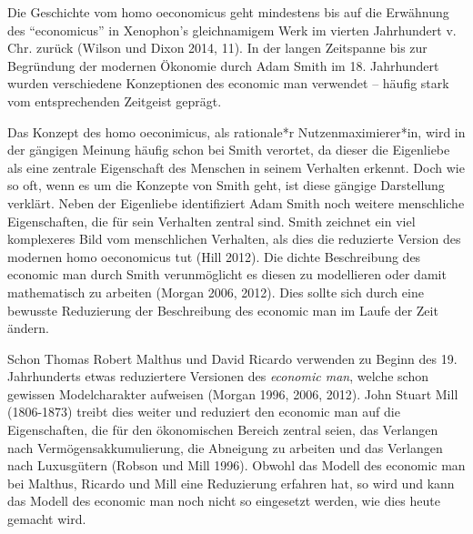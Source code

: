 \documentclass[
  nswissgerman,
  a4paper,
  DIV=11,
  numbers=noendperiod,
  oneside,
  openany]{scrreprt}
\begin{document}
\begin{tcolorbox}[enhanced jigsaw, arc=.35mm, bottomrule=.15mm, bottomtitle=1mm, breakable, colback=white, colbacktitle=quarto-callout-tip-color!10!white, colframe=quarto-callout-tip-color-frame, coltitle=black, left=2mm, leftrule=.75mm, opacityback=0, opacitybacktitle=0.6, rightrule=.15mm, title={Exkurs: Geschichte des Homo Oeconomicus}, titlerule=0mm, toprule=.15mm, toptitle=1mm]

Die Geschichte vom homo oeconomicus geht mindestens bis auf die
Erwähnung des ``economicus'' in Xenophon's gleichnamigem Werk im vierten
Jahrhundert v. Chr. zurück (Wilson und Dixon 2014, 11). In der langen
Zeitspanne bis zur Begründung der modernen Ökonomie durch Adam Smith im
18. Jahrhundert wurden verschiedene Konzeptionen des economic
man\footnotemark{} verwendet -- häufig stark vom entsprechenden
Zeitgeist geprägt.

Das Konzept des homo oeconimicus, als rationale*r Nutzenmaximierer*in,
wird in der gängigen Meinung häufig schon bei Smith verortet, da dieser
die Eigenliebe als eine zentrale Eigenschaft des Menschen in seinem
Verhalten erkennt. Doch wie so oft, wenn es um die Konzepte von Smith
geht, ist diese gängige Darstellung verklärt. Neben der Eigenliebe
identifiziert Adam Smith noch weitere menschliche Eigenschaften, die für
sein Verhalten zentral sind. Smith zeichnet ein viel komplexeres Bild
vom menschlichen Verhalten, als dies die reduzierte Version des modernen
homo oeconomicus tut (Hill 2012). Die dichte Beschreibung des economic
man durch Smith verunmöglicht es diesen zu modellieren oder damit
mathematisch zu arbeiten (Morgan 2006, 2012). Dies sollte sich durch
eine bewusste Reduzierung der Beschreibung des economic man im Laufe der
Zeit ändern.

Schon Thomas Robert Malthus und David Ricardo verwenden zu Beginn des
19. Jahrhunderts etwas reduziertere Versionen des \emph{economic man},
welche schon gewissen Modelcharakter aufweisen (Morgan 1996, 2006,
2012). John Stuart Mill (1806-1873) treibt dies weiter und reduziert den
economic man auf die Eigenschaften, die für den ökonomischen Bereich
zentral seien, das Verlangen nach Vermögensakkumulierung, die Abneigung
zu arbeiten und das Verlangen nach Luxusgütern (Robson und Mill 1996).
Obwohl das Modell des economic man bei Malthus, Ricardo und Mill eine
Reduzierung erfahren hat, so wird und kann das Modell des economic man
noch nicht so eingesetzt werden, wie dies heute gemacht wird.


\end{tcolorbox}
\end{document}
